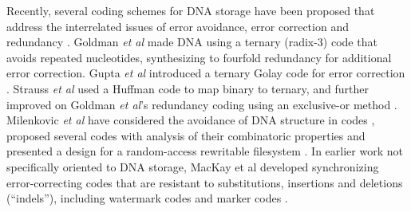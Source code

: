 \documentclass[english]{article}
\begin{document}
Recently, several coding schemes for DNA storage have been proposed
that address the interrelated issues of error avoidance, error correction and redundancy
\cite{GoldmanEtAl2013,MilenkovicEtAl2005,YazdiEtAl2015,GuptaEtAl2015,MilenkovicEtAl2014,MilenkovicEtAl2015,GabrysEtAl2015,MilenkovicEtAl2016,BornholtEtAl2016}.
Goldman {\em et al} \cite{GoldmanEtAl2013} made DNA using a ternary (radix-3) code that avoids repeated nucleotides,
synthesizing to fourfold redundancy for additional error correction.
Gupta {\em et al} introduced a ternary Golay code for error correction \cite{GuptaEtAl2015}.
Strauss {\em et al} used a Huffman code to map binary to ternary, and further improved on Goldman {\em et al}'s redundancy coding using an exclusive-or method \cite{BornholtEtAl2016}.
Milenkovic {\em et al} have considered
the avoidance of DNA structure in codes \cite{MilenkovicEtAl2005},
proposed several codes with analysis of their combinatoric properties \cite{MilenkovicEtAl2014,MilenkovicEtAl2015,GabrysEtAl2015,MilenkovicEtAl2016}
and presented a design for a random-access rewritable filesystem \cite{YazdiEtAl2015}.
In earlier work not specifically oriented to DNA storage,
MacKay et al developed synchronizing error-correcting codes that are resistant to
substitutions, insertions and deletions (``indels''),
including watermark codes \cite{DaveyMackay2000,DaveyMackay2001}
and marker codes \cite{RatzerMackay2000}.
\end{document}
